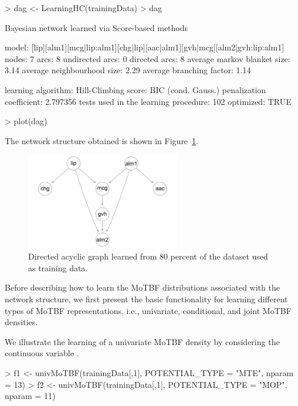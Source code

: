 \begin{example}
>   dag <- LearningHC(trainingData)
>   dag

Bayesian network learned via Score-based methods

model:
[lip][alm1][mcg|lip:alm1][chg|lip][aac|alm1][gvh|mcg][alm2|gvh:lip:alm1] 
nodes:                                 7 
arcs:                                  8 
undirected arcs:                       0 
directed arcs:                         8 
average markov blanket size:           3.14 
average neighbourhood size:            2.29 
average branching factor:              1.14 

learning algorithm:                    Hill-Climbing 
score:                                 BIC (cond. Gauss.) 
penalization coefficient:              2.797356 
tests used in the learning procedure:  102 
optimized:                             TRUE 
\end{example}

\begin{example}
> plot(dag)
\end{example}


The network structure obtained is shown in Figure~\ref{fig:dag}. 

\begin{figure}[htbp]
	\centering

	\includegraphics[width=0.6\textwidth]{FIGS/dagEcoli.png}

	\caption{Directed acyclic graph learned from 80 percent of the  dataset used as training data.}
	\label{fig:dag}
\end{figure}

Before describing how to learn the MoTBF distributions associated with the network structure, we first present the basic
functionality for learning different types of MoTBF representations, i.e., univariate, conditional, and joint
MoTBF densities.

We illustrate the learning of a univariate MoTBF density by considering the continuous variable .  
\begin{example}
> f1 <- univMoTBF(trainingData[,1], POTENTIAL_TYPE = "MTE", nparam = 13)
> f2 <- univMoTBF(trainingData[,1], POTENTIAL_TYPE = "MOP", nparam = 11)
\end{example}

